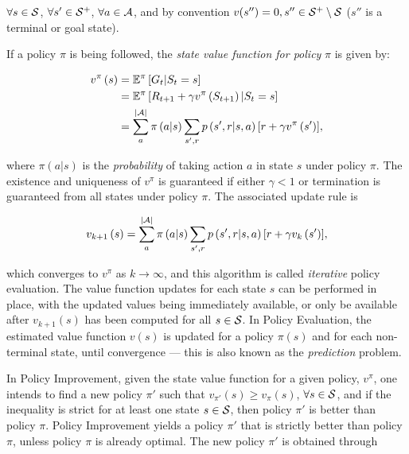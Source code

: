 \documentclass[a4paper]{article}
\begin{document}
$\forall s \in \cal{S}$, $\forall s' \in \cal{S^{+}}$, $\forall a \in \cal{A}$, and by convention $v(s'') = 0, s'' \in \cal{S^{+}} \setminus \cal{S}$ ($s''$ is a terminal or goal state).

If a policy $\pi$ is being followed, the \textit{state value function for policy} $\pi$ is given by:

\begin{align}
v^{\pi}\left( s \right) &= \mathbb{E}^{\pi} \left[ G_t | S_t =s \right] \\
                              &= \mathbb{E}^{\pi} \left[ R_{t+1} + \gamma v^{\pi}\left( S_{t+1} \right) | S_t = s \right] \\
                              &= \sum\limits_{a}^{|{\cal A}|} \pi \left( a|s\right) \sum\limits_{s',r} { p\left( {s',r|s,a} \right) \left[ r + \gamma v^{\pi}\left( s' \right) \right] },
\end{align}

where $\pi \left( a | s \right)$ is the \textit{probability} of taking action $a$ in state $s$ under policy $\pi$. The existence and uniqueness of $v^{\pi}$ is guaranteed if either $\gamma < 1$ or termination is guaranteed from all states under policy $\pi$. The associated update rule is 

\begin{align}
v_{k+1}\left( s \right) = \sum\limits_{a}^{|{\cal A}|} \pi \left( a|s\right) \sum\limits_{s',r} { p\left( {s',r|s,a} \right) \left[ r + \gamma v_{k}\left( s' \right) \right] },
\end{align}

which converges to $v^{\pi}$ as $k \to \infty$, and this algorithm is called \textit{iterative} policy evaluation. The value function updates for each state $s$ can be performed in place, with the updated values being immediately available, or only be available after $v_{k+1}\left( s \right)$ has been computed for all $s \in \cal{S}$. In Policy Evaluation, the estimated value function $v(s)$ is updated for a policy $\pi \left( s \right)$ and for each non-terminal state, until convergence --- this is also known as the \textit{prediction} problem.

In Policy Improvement, given the state value function for a given policy, $v^{\pi}$, one intends to find a new policy $\pi'$ such that $v_{\pi'}\left( s \right) \geq v_{\pi}\left( s \right)$, $\forall s \in \cal{S}$, and if the inequality is strict for at least one state $s \in \cal{S}$, then policy $\pi'$ is better than policy $\pi$. Policy Improvement yields a policy $\pi'$ that is strictly better than policy $\pi$, unless policy $\pi$ is already optimal. The new policy $\pi'$ is obtained through
\end{document}
